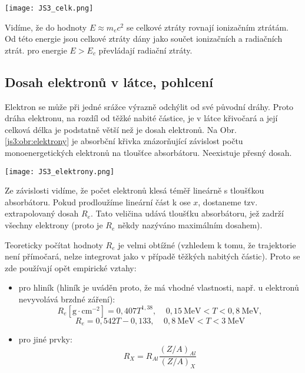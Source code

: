 \documentclass[../../main.tex]{subfiles}
\begin{document}
\begin{center}
	\texttt{[image: JS3\_celk.png]}
\end{center}

Vidíme, že do hodnoty $E \approx m_e c^2$ se celkové ztráty rovnají ionizačním ztrátám. Od této energie jsou celkové ztráty dány jako součet ionizačních a radiačních ztrát. pro energie $E > E_c$ převládají radiační ztráty.

\subsection{Dosah elektronů v látce, pohlcení}

Elektron se může při jedné srážce výrazně odchýlit od své původní dráhy. Proto dráha elektronu, na rozdíl od těžké nabité částice, je v látce křivočará a její celková délka je podstatně větší než je dosah elektronů. Na Obr. \ref{js3:obr:elektrony} je absorbční křivka znázorňující závislost počtu monoenergetických elektronů na tloušťce absorbátoru. Neexistuje přesný dosah.

 \begin{center}
 	\texttt{[image: JS3\_elektrony.png]}
 \end{center}

Ze závislosti vidíme, že počet elektronů klesá téměř lineárně s tloušťkou absorbátoru. Pokud prodloužíme lineární část k ose $x$, dostaneme tzv. extrapolovaný dosah $R_e$. Tato veličina udává tloušťku absorbátoru, jež zadrží všechny elektrony (proto je $R_e$ někdy nazýváno maximálním dosahem).

Teoreticky počítat hodnoty $R_e$ je velmi obtížné (vzhledem k tomu, že trajektorie není přímočará, nelze integrovat jako v případě těžkých nabitých částic). Proto se zde používají opět empirické vztahy:
\begin{itemize}
	\item pro hliník (hliník je uváděn proto, že má vhodné vlastnosti, např. u elektronů nevyvolává brzdné záření):
	\begin{equation}
	R_e [\mathrm{g\cdotp cm^{-2}}] = 0,407 T^{1,38} , ~~~~~ 0,15 ~\mathrm{MeV} < T < 0,8 ~\mathrm{MeV},
	\end{equation}
	\begin{equation}
	R_e = 0,542 T - 0,133, ~~~~~0,8 ~\mathrm{MeV} < T < 3 ~\mathrm{MeV}
	\end{equation}
	\item pro jiné prvky: 
	\begin{equation}
	R_X = R_{Al} \dfrac{(Z/A)_{Al}}{(Z/A)_X}
	\end{equation}
\end{itemize}	
	
\end{document}
